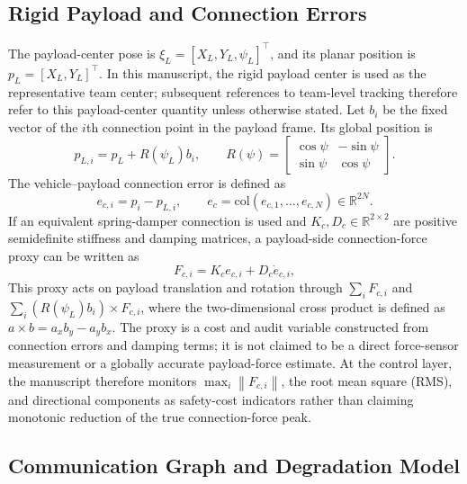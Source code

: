 \documentclass[twocolumn,3p,times,procedia]{elsarticle}
\newcommand{\R}{\mathbb{R}}
\newcommand{\norm}[1]{\left\lVert #1 \right\rVert}
\begin{document}
\subsection{Rigid Payload and Connection Errors}

The payload-center pose is $\xi_L=[X_L,Y_L,\psi_L]^\top$, and its planar position is $p_L=[X_L,Y_L]^\top$. In this manuscript, the rigid payload center is used as the representative team center; subsequent references to team-level tracking therefore refer to this payload-center quantity unless otherwise stated. Let $b_i$ be the fixed vector of the $i$th connection point in the payload frame. Its global position is
\begin{equation}
p_{L,i}=p_L+R(\psi_L)b_i,\qquad
R(\psi)=\begin{bmatrix}\cos\psi&-\sin\psi\\ \sin\psi&\cos\psi\end{bmatrix}.
\label{eq:payload_anchor}
\end{equation}
The vehicle--payload connection error is defined as
\begin{equation}
e_{c,i}=p_i-p_{L,i},\qquad
e_c=\mathrm{col}(e_{c,1},\ldots,e_{c,N})\in\R^{2N}.
\label{eq:connection_error}
\end{equation}
If an equivalent spring-damper connection is used and $K_c,D_c\in\R^{2\times2}$ are positive semidefinite stiffness and damping matrices, a payload-side connection-force proxy can be written as
\begin{equation}
F_{c,i}=K_c e_{c,i}+D_c\dot e_{c,i},
\label{eq:connection_force}
\end{equation}
This proxy acts on payload translation and rotation through $\sum_i F_{c,i}$ and $\sum_i (R(\psi_L)b_i)\times F_{c,i}$, where the two-dimensional cross product is defined as $a\times b=a_xb_y-a_yb_x$. The proxy is a cost and audit variable constructed from connection errors and damping terms; it is not claimed to be a direct force-sensor measurement or a globally accurate payload-force estimate. At the control layer, the manuscript therefore monitors $\max_i\norm{F_{c,i}}$, the root mean square (RMS), and directional components as safety-cost indicators rather than claiming monotonic reduction of the true connection-force peak.

\subsection{Communication Graph and Degradation Model}
\end{document}
